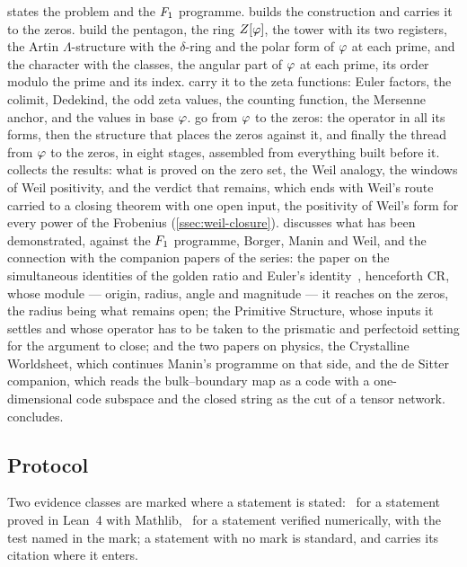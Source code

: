  states the problem and the $F_1$ programme.   builds the construction and carries it to the zeros.   build the pentagon, the ring $Z[\varphi]$, the tower with its two registers, the Artin $\Lambda$-structure with the $\delta$-ring and the polar
form of $\varphi$ at each prime, and the character with the classes, the angular part of $\varphi$ at each prime, its order modulo the prime and its index.   carry it to the zeta functions: Euler factors, the colimit, Dedekind, the odd zeta values, the counting
function, the Mersenne anchor, and the values in base $\varphi$.   go from $\varphi$ to the zeros: the operator in all its forms, then the structure that places the zeros against it, and finally the thread from $\varphi$ to the zeros, in eight stages, assembled from everything built before it.   collects the results: what is proved on
the zero set, the Weil analogy, the windows of Weil positivity, and the verdict that
remains, which ends with Weil's route carried to a closing theorem with one open input, the positivity of
Weil's form for every power of the Frobenius (\cref{ssec:weil-closure}).   discusses what has been demonstrated, against the $F_1$ programme, Borger, Manin and
Weil, and the connection with the companion papers of the series: the paper on the simultaneous
identities of the golden ratio and Euler's identity~\cite{gonzalez26mersenne}, henceforth CR, whose module
--- origin, radius, angle and magnitude --- it reaches on the zeros, the radius being what remains open;
the Primitive Structure, whose inputs it settles and whose operator has to be taken to the prismatic and
perfectoid setting for the argument to close; and the two papers on physics, the Crystalline Worldsheet, which continues Manin's
programme on that side, and the de Sitter companion, which reads the bulk--boundary map as a code with a
one-dimensional code subspace and the closed string as the cut of a tensor network.   concludes.

\subsection{Protocol}\label{ssec:protocol}

Two evidence classes are marked where a statement is stated: \ for a statement proved in
Lean~4 with Mathlib, \ for a statement verified numerically, with the test named in the
mark; a statement with no mark is standard, and carries its citation where it enters.

